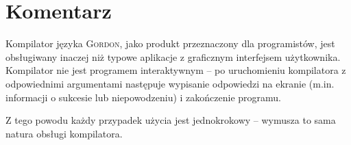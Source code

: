 \documentclass{documentation}
\begin{document}
\section{Komentarz}
\noindent Kompilator języka \textsc{Gordon}, jako produkt przeznaczony dla programistów, jest
obsługiwany inaczej niż typowe aplikacje z graficznym interfejsem użytkownika.
Kompilator nie jest programem interaktywnym -- po uruchomieniu kompilatora z
odpowiednimi argumentami następuje wypisanie odpowiedzi na ekranie (m.in.
informacji o sukcesie lub niepowodzeniu) i zakończenie programu.

Z tego powodu każdy przypadek użycia jest jednokrokowy -- wymusza to sama natura obsługi
kompilatora.
\end{document}
